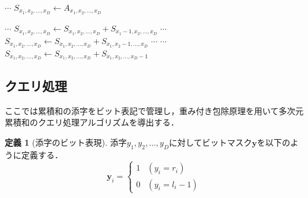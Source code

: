 \documentclass[12pt]{jsreport}
\theoremstyle{plain} %
\theoremstyle{definition}
\newtheorem{definition}{定義}
\begin{document}
\begin{algorithm}
    \caption{D次元累積和の構築}
    \begin{algorithmic}[1]
        \STATE {}
        \STATE $\cdots$
        \STATE $S_{x_1, x_2, \ldots, x_D} \leftarrow A_{x_1, x_2, \ldots, x_D}$
        \ENDFOR
        \ENDFOR
        \ENDFOR

        \STATE
        \STATE {}
        \STATE $\cdots$
        \STATE $S_{x_1, x_2, \ldots, x_D} \leftarrow S_{x_1, x_2, \ldots, x_D} + S_{x_1-1, x_2, \ldots, x_D}$
        \ENDFOR
        \ENDFOR
        \ENDFOR
        \STATE $\cdots$
        \STATE $S_{x_1, x_2, \ldots, x_D} \leftarrow S_{x_1, x_2, \ldots, x_D} + S_{x_1, x_2-1, \ldots, x_D}$
        \ENDFOR
        \ENDFOR
        \ENDFOR
        \STATE $\cdots$
        \STATE $\cdots$
        \STATE $S_{x_1, x_2, \ldots, x_D} \leftarrow S_{x_1, x_2, \ldots, x_D} + S_{x_1, x_2, \ldots, x_D-1}$
        \ENDFOR
        \ENDFOR
        \ENDFOR
    \end{algorithmic}
\end{algorithm}

\subsection{クエリ処理}

ここでは累積和の添字をビット表記で管理し，重み付き包除原理を用いて多次元累積和のクエリ処理アルゴリズムを導出する．

\begin{definition}[添字のビット表現]
    添字$y_1, y_2, \ldots, y_D$に対してビットマスク$\mathbf{y}$を以下のように定義する．
    \begin{equation}
        \mathbf{y}_i = \begin{cases}
            1 & (y_i = r_i) \\
            0 & (y_i = l_i-1)
        \end{cases}
    \end{equation}
\end{definition}
\end{document}
